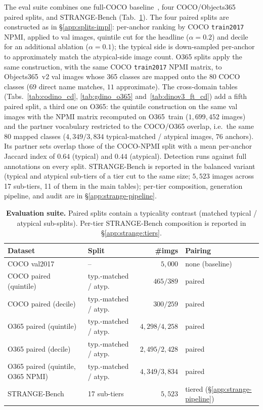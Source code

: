 The eval suite combines one full-COCO baseline~\cite{mscoco14}, four COCO/Objects365~\cite{shao2019objects365} paired splits, and STRANGE-Bench (Tab.~\ref{tab:app-eval-datasets}). The four paired splits are constructed as in \S\ref{app:splits-impl}: per-anchor ranking by COCO \texttt{train2017} NPMI, applied to val images, quintile cut for the headline ($\alpha = 0.2$) and decile for an additional ablation ($\alpha = 0.1$); the typical side is down-sampled per-anchor to approximately match the atypical-side image count. O365 splits apply the same construction, with the same COCO \texttt{train2017} NPMI matrix, to Objects365~v2 val images whose 365 classes are mapped onto the 80 COCO classes ($69$ direct name matches, $11$ approximate). The cross-domain tables (Tabs.~\ref{tab:codino_cd}, \ref{tab:gdino_o365} and~\ref{tab:dinov3_ft_cd}) add a fifth paired split, a third one on O365: the quintile construction on the same val images with the NPMI matrix recomputed on O365~train ($1{,}699{,}452$ images) and the partner vocabulary restricted to the COCO/O365 overlap, i.e.\ the same $80$ mapped classes ($4{,}349 / 3{,}834$ typical-matched / atypical images, $76$ anchors). Its partner sets overlap those of the COCO-NPMI split with a mean per-anchor Jaccard index of $0.64$ (typical) and $0.44$ (atypical). Detection runs against full annotations on every split. STRANGE-Bench is reported in the balanced variant (typical and atypical sub-tiers of a tier cut to the same size; $5{,}523$ images across 17 sub-tiers, 11 of them in the main tables); per-tier composition, generation pipeline, and audit are in \S\ref{app:strange-pipeline}.

\begin{table}[h]
\centering
\small
\caption{\textbf{Evaluation suite.} Paired splits contain a typicality
contrast (matched typical / atypical sub-splits). Per-tier
STRANGE-Bench composition is reported in \S\ref{app:strange:tiers}.}
\label{tab:app-eval-datasets}
\begin{tabular}{@{}llrl@{}}
\toprule
Dataset & Split & \#imgs & Pairing \\
\midrule
COCO val2017~\cite{mscoco14} & --                                  & $5{,}000$ & none (baseline) \\
COCO paired (quintile)  & typ.-matched / atyp.     & $465 / 389$  & paired \\
COCO paired (decile)    & typ.-matched / atyp.     & $300 / 259$  & paired \\
O365 paired (quintile)  & typ.-matched / atyp.     & $4{,}298 / 4{,}258$ & paired \\
O365 paired (decile)    & typ.-matched / atyp.     & $2{,}495 / 2{,}428$ & paired \\
O365 paired (quintile, O365 NPMI) & typ.-matched / atyp. & $4{,}349 / 3{,}834$ & paired \\
\midrule
STRANGE-Bench & 17 sub-tiers           & $5{,}523$    & tiered (\S\ref{app:strange-pipeline}) \\
\bottomrule
\end{tabular}
\end{table}

